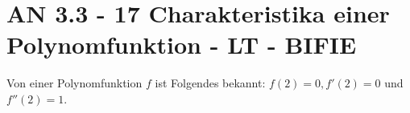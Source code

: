 \section{AN 3.3 - 17 Charakteristika einer Polynomfunktion - LT - BIFIE}

\begin{beispiel}[AN 3.3]{1} %
				Von einer Polynomfunktion $f$ ist Folgendes bekannt: $f(2)=0,f'(2)=0$ und $f''(2)=1$.
				
\end{beispiel}